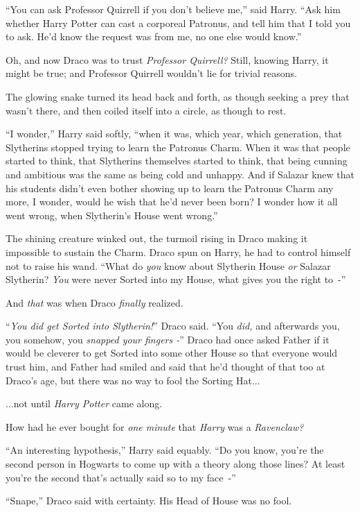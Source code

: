 ``You can ask Professor Quirrell if you don't believe me,'' said Harry. ``Ask him whether Harry Potter can cast a corporeal Patronus, and tell him that I told you to ask. He'd know the request was from me, no one else would know.''

Oh, and now Draco was to trust \emph{Professor Quirrell?} Still, knowing Harry, it might be true; and Professor Quirrell wouldn't lie for trivial reasons.

The glowing snake turned its head back and forth, as though seeking a prey that wasn't there, and then coiled itself into a circle, as though to rest.

``I wonder,'' Harry said softly, ``when it was, which year, which generation, that Slytherins stopped trying to learn the Patronus Charm. When it was that people started to think, that Slytherins themselves started to think, that being cunning and ambitious was the same as being cold and unhappy. And if Salazar knew that his students didn't even bother showing up to learn the Patronus Charm any more, I wonder, would he wish that he'd never been born? I wonder how it all went wrong, when Slytherin's House went wrong.''

The shining creature winked out, the turmoil rising in Draco making it impossible to sustain the Charm. Draco spun on Harry, he had to control himself not to raise his wand. ``What do \emph{you} know about Slytherin House \emph{or} Salazar Slytherin? \emph{You} were never Sorted into my House, what gives you the right to~-''

And \emph{that} was when Draco \emph{finally} realized.

``\emph{You did get Sorted into Slytherin!}'' Draco said. ``You \emph{did,} and afterwards you, you somehow, you \emph{snapped your fingers -}'' Draco had once asked Father if it would be cleverer to get Sorted into some other House so that everyone would trust him, and Father had smiled and said that he'd thought of that too at Draco's age, but there was no way to fool the Sorting Hat...

...not until \emph{Harry Potter} came along.

How had he ever bought for \emph{one minute} that \emph{Harry} was a \emph{Ravenclaw?}

``An interesting hypothesis,'' Harry said equably. ``Do you know, you're the second person in Hogwarts to come up with a theory along those lines? At least you're the second that's actually said so to my face~-''

``Snape,'' Draco said with certainty. His Head of House was no fool.

